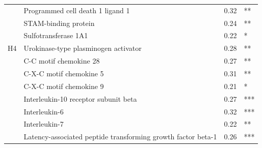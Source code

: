 \begin{table}[ht]
{\begin{tabular}{clll}
                                           & Programmed cell death 1 ligand 1                                            & 0.32                               & **                                      \\
                                           & STAM-binding protein                                                        & 0.24                               & **                                      \\
                                           & Sulfotransferase 1A1                                                        & 0.22                               & *                                       \\
\multirow{-9}{*}{H4}                       & Urokinase-type plasminogen activator                                        & 0.28                               & **                                      \\ \hline
                                           & \cellcolor[HTML]{EFEFEF}C-C motif chemokine 28                              & \cellcolor[HTML]{EFEFEF}0.27       & \cellcolor[HTML]{EFEFEF}**              \\
                                           & \cellcolor[HTML]{EFEFEF}C-X-C motif chemokine 5                             & \cellcolor[HTML]{EFEFEF}0.31       & \cellcolor[HTML]{EFEFEF}**              \\
                                           & \cellcolor[HTML]{EFEFEF}C-X-C motif chemokine 9                             & \cellcolor[HTML]{EFEFEF}0.21       & \cellcolor[HTML]{EFEFEF}*               \\
                                           & \cellcolor[HTML]{EFEFEF}Interleukin-10 receptor subunit beta                & \cellcolor[HTML]{EFEFEF}0.27       & \cellcolor[HTML]{EFEFEF}***             \\
                                           & Interleukin-6                                                               & 0.32                               & ***                                     \\
                                           & Interleukin-7                                                               & 0.22                               & **                                      \\
                                           & Latency-associated peptide transforming growth factor beta-1                & 0.26                               & ***                                     \\

\end{tabular}}
\end{table}
